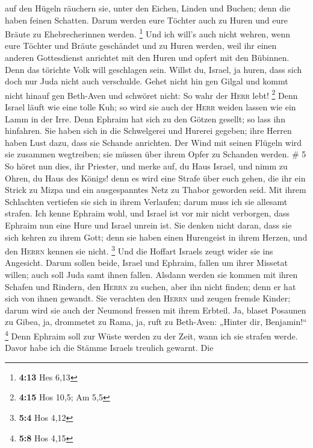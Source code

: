 auf den Hügeln räuchern sie, unter den Eichen, Linden und Buchen; denn
die haben feinen Schatten. Darum werden eure Töchter auch zu Huren und
eure Bräute zu Ehebrecherinnen werden. \footnote{\textbf{4:13} Hes 6,13}
 Und ich will's auch nicht wehren, wenn eure Töchter und
Bräute geschändet und zu Huren werden, weil ihr einen anderen
Gottesdienst anrichtet mit den Huren und opfert mit den Bübinnen. Denn
das törichte Volk will geschlagen sein.  Willst du,
Israel, ja huren, dass sich doch nur Juda nicht auch verschulde. Gehet
nicht hin gen Gilgal und kommt nicht hinauf gen Beth-Aven und schwöret
nicht: So wahr der \textsc{Herr} lebt! \footnote{\textbf{4:15} Hos 10,5;
  Am 5,5}  Denn Israel läuft wie eine tolle Kuh; so wird
sie auch der \textsc{Herr} weiden lassen wie ein Lamm in der Irre.
 Denn Ephraim hat sich zu den Götzen gesellt; so lass ihn
hinfahren.  Sie haben sich in die Schwelgerei und Hurerei
gegeben; ihre Herren haben Lust dazu, dass sie Schande anrichten.
 Der Wind mit seinen Flügeln wird sie zusammen
wegtreiben; sie müssen über ihrem Opfer zu Schanden werden. \# 5
 So höret nun dies, ihr Priester, und merke auf, du Haus
Israel, und nimm zu Ohren, du Haus des Königs! denn es wird eine Strafe
über euch gehen, die ihr ein Strick zu Mizpa und ein ausgespanntes Netz
zu Thabor geworden seid.  Mit ihrem Schlachten vertiefen
sie sich in ihrem Verlaufen; darum muss ich sie allesamt strafen.
 Ich kenne Ephraim wohl, und Israel ist vor mir nicht
verborgen, dass Ephraim nun eine Hure und Israel unrein ist.
 Sie denken nicht daran, dass sie sich kehren zu ihrem
Gott; denn sie haben einen Hurengeist in ihrem Herzen, und den
\textsc{Herrn} kennen sie nicht. \footnote{\textbf{5:4} Hos 4,12}
 Und die Hoffart Israels zeugt wider sie ins Angesicht.
Darum sollen beide, Israel und Ephraim, fallen um ihrer Missetat willen;
auch soll Juda samt ihnen fallen.  Alsdann werden sie
kommen mit ihren Schafen und Rindern, den \textsc{Herrn} zu suchen, aber
ihn nicht finden; denn er hat sich von ihnen gewandt.  Sie
verachten den \textsc{Herrn} und zeugen fremde Kinder; darum wird sie
auch der Neumond fressen mit ihrem Erbteil.  Ja, blaset
Posaunen zu Gibea, ja, drommetet zu Rama, ja, ruft zu Beth-Aven: „Hinter
dir, Benjamin!{}`` \footnote{\textbf{5:8} Hos 4,15}  Denn
Ephraim soll zur Wüste werden zu der Zeit, wann ich sie strafen werde.
Davor habe ich die Stämme Israels treulich gewarnt.  Die
